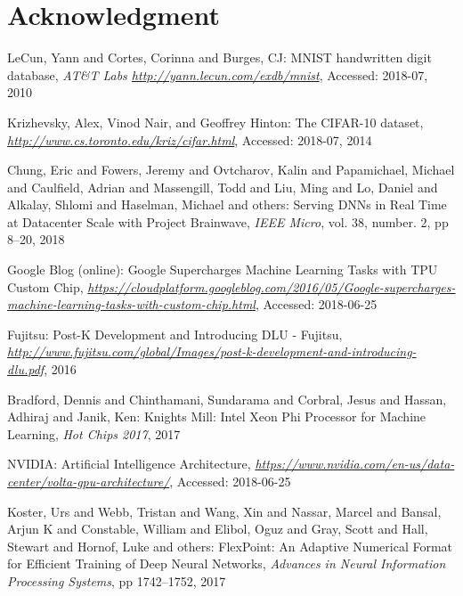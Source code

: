 \documentclass[techrep,english]{ipsj} %
\begin{document}
\section{Acknowledgment}\label{sec:acknowledgment}

\begin{thebibliography}{99}

  LeCun, Yann and Cortes, Corinna and Burges, CJ:
  MNIST handwritten digit database,
  {\it AT\&T Labs \url{http://yann.lecun.com/exdb/mnist}},
  Accessed: 2018-07, 2010

  Krizhevsky, Alex, Vinod Nair, and Geoffrey Hinton:
  The CIFAR-10 dataset,
  {\it \url{http://www.cs.toronto.edu/kriz/cifar.html}},
  Accessed: 2018-07, 2014

  Chung, Eric and Fowers, Jeremy and Ovtcharov, Kalin and Papamichael, Michael and Caulfield, Adrian and Massengill, Todd and Liu, Ming and Lo, Daniel and Alkalay, Shlomi and Haselman, Michael and others:
  Serving DNNs in Real Time at Datacenter Scale with Project Brainwave,
  {\it IEEE Micro},
  vol. 38, number. 2, pp 8--20, 2018

  Google Blog (online):
  Google Supercharges Machine Learning Tasks with TPU Custom Chip,
  {\it \url{https://cloudplatform.googleblog.com/2016/05/Google-supercharges-machine-learning-tasks-with-custom-chip.html}},
  Accessed: 2018-06-25

  Fujitsu:
  Post-K Development and Introducing DLU - Fujitsu,
  {\it \url{http://www.fujitsu.com/global/Images/post-k-development-and-introducing-dlu.pdf}},
  2016

  Bradford, Dennis and Chinthamani, Sundarama and Corbral, Jesus and Hassan, Adhiraj and Janik, Ken:
  Knights Mill: Intel Xeon Phi Processor for Machine Learning,
  {\it Hot Chips 2017},
  2017
  
  NVIDIA:
  Artificial Intelligence Architecture,
  {\it \url{https://www.nvidia.com/en-us/data-center/volta-gpu-architecture/}},
  Accessed: 2018-06-25

  Koster, Urs and Webb, Tristan and Wang, Xin and Nassar, Marcel and Bansal, Arjun K and Constable, William and Elibol, Oguz and Gray, Scott and Hall, Stewart and Hornof, Luke and others:
  FlexPoint: An Adaptive Numerical Format for Efficient Training of Deep Neural Networks,
  {\it Advances in Neural Information Processing Systems},
  pp 1742--1752, 2017


\end{thebibliography}
\end{document}
